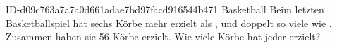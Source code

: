 \begin{exercise}
      {ID-d09c763a7a7a0d661adae7bd97facd916544b471}
      {Basketball}
  \ifproblem\problem
    Beim letzten Basketballspiel hat \xya{} sechs Körbe mehr erzielt als \xyb,
    und \xyb{} doppelt so viele wie \xyc. Zusammen haben sie 56 Körbe erzielt.
    Wie viele Körbe hat jeder erzielt?
  \fi
\end{exercise}
